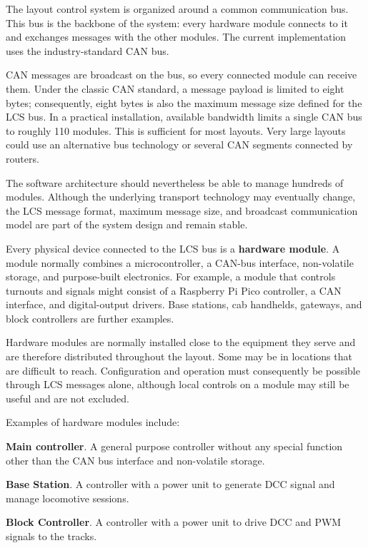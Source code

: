 
The layout control system is organized around a common communication bus. This bus is the backbone of the system: every hardware module connects to it and exchanges messages with the other modules. The current implementation uses the industry-standard CAN bus.

CAN messages are broadcast on the bus, so every connected module can receive them. Under the classic CAN standard, a message payload is limited to eight bytes; consequently, eight bytes is also the maximum message size defined for the LCS bus. In a practical installation, available bandwidth limits a single CAN bus to roughly 110 modules. This is sufficient for most layouts. Very large layouts could use an alternative bus technology or several CAN segments connected by routers.

The software architecture should nevertheless be able to manage hundreds of modules. Although the underlying transport technology may eventually change, the LCS message format, maximum message size, and broadcast communication model are part of the system design and remain stable.


Every physical device connected to the LCS bus is a \textbf{hardware module}. A module normally combines a microcontroller, a CAN-bus interface, non-volatile storage, and purpose-built electronics. For example, a module that controls turnouts and signals might consist of a Raspberry Pi Pico controller, a CAN interface, and digital-output drivers. Base stations, cab handhelds, gateways, and block controllers are further examples.

Hardware modules are normally installed close to the equipment they serve and are therefore distributed throughout the layout. Some may be in locations that are difficult to reach. Configuration and operation must consequently be possible through LCS messages alone, although local controls on a module may still be useful and are not excluded.

Examples of hardware modules include:

\begin{smallGapItemize}
\item \textbf{Main controller}. A general purpose controller without any special function other than the CAN bus interface and non-volatile storage.
\item \textbf{Base Station}. A controller with a power unit to generate DCC signal and manage locomotive sessions.
\item \textbf{Block Controller}. A controller with a power unit to drive DCC and PWM signals to the tracks.

\end{smallGapItemize}

